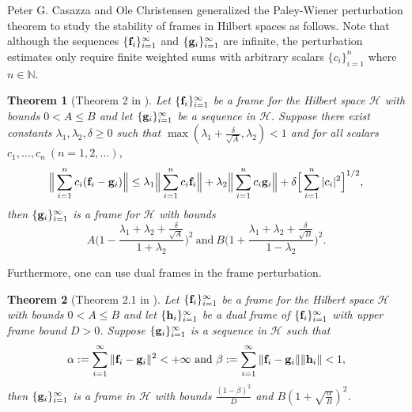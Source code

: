 \documentclass{amsart}
\numberwithin{equation}{section}
\theoremstyle{plain}
\newtheorem{theorem}{Theorem}[section]
\theoremstyle{definition}
\begin{document}
Peter G. Casazza and Ole Christensen generalized the Paley-Wiener perturbation theorem to study the stability of frames in Hilbert spaces as follows. Note that although the sequences $\{{\bf f}_i\}_{i=1}^{\infty}$ and $\{{\bf g}_i\}_{i=1}^{\infty}$
are infinite, the perturbation estimates only require finite weighted sums with arbitrary scalars $\{c_i\}_{i=1}^n$ where $n \in \mathbb{N}$.

\begin{theorem}[Theorem 2 in \cite{cazassa1997perturbation}]\label{PaleyFrame2}
Let $\{{\bf f}_i\}_{i=1}^{\infty}$ be a frame for the Hilbert space $\mathcal{H}$ with bounds $0<A \leq B$ and let $\{{\bf g}_i\}_{i=1}^{\infty}$ be a sequence in $\mathcal{H}$. Suppose there exist constants $\lambda_1,\lambda_2, \delta \geq 0$ such that $\max (\lambda_1 + \frac{\delta}{\sqrt{A}}, \lambda_2) < 1$ and for all scalars $c_1, \dots, c_n \ (n=1, 2, \dots)$,
    \begin{equation*}
  \Big   \Vert \sum\limits_{i=1}^n c_i ({\bf f}_i-{\bf g}_i) \Big \Vert \leq \lambda_1  \Big \Vert \sum\limits_{i=1}^n c_i {\bf f}_i \Big \Vert + \lambda_2  \Big \Vert \sum\limits_{i=1}^n c_i {\bf g}_i \Big \Vert + \delta  \Big [ \sum\limits_{i=1}^n |c_i|^2 \Big ]^{1/2},
    \end{equation*}
then $\{{\bf g}_i\}_{i=1}^{\infty}$ is a frame for $\mathcal{H}$ with bounds
\begin{equation*}
   A \Big (1-\frac{\lambda_1+\lambda_2 + \frac{\delta}{\sqrt{A}}}{1+\lambda_2} \Big )^2 \ \text{and} \ B \Big (1+\frac{\lambda_1+\lambda_2 + \frac{\delta}{\sqrt{B}}}{1-\lambda_2} \Big )^2.
\end{equation*}
\end{theorem}


Furthermore, one can use dual frames in the frame perturbation.
\begin{theorem}[Theorem 2.1 in \cite{chen2014perturbations}]\label{PaleyDualFrames}
    Let $\{{\bf f}_i\}_{i=1}^{\infty}$ be a frame for the Hilbert space $\mathcal{H}$ with bounds $0<A \leq B$ and let $\{{\bf h}_i\}_{i=1}^{\infty}$ be a dual frame of $\{{\bf f}_i\}_{i=1}^{\infty}$ with upper frame bound $D>0$. Suppose $\{{\bf g}_i\}_{i=1}^{\infty}$ is a sequence in $\mathcal{H}$ such that 
    \begin{equation*}
       \alpha:= \sum_{i=1}^\infty \Vert {\bf f}_i-{\bf g}_i \Vert^2 < +\infty  \ \text{and} \ \beta:= \sum_{i=1}^\infty \Vert {\bf f}_i-{\bf g}_i \Vert \Vert {\bf h}_i \Vert < 1,
    \end{equation*}
then $\{{\bf g}_i\}_{i=1}^{\infty}$ is a frame in $\mathcal{H}$ with bounds $\frac{(1-\beta)^2}{D}$ and $B(1+\sqrt{\frac{\alpha}{B}})^2$.
\end{theorem}
\end{document}
